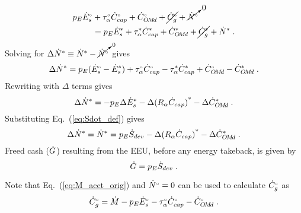 \begin{landscape}
{\begin{align}
  p_E {}{\dot{E}}^{\scriptscriptstyle \circ}_s &+ {}{\tau}^{\scriptscriptstyle \circ}_\alpha {}{\dot{C}}^{\scriptscriptstyle \circ}_{cap} + {}{\dot{C}}^{\scriptscriptstyle \circ}_{O\!M\!d} + \cancel{{}{\dot{C}}^{\scriptscriptstyle \circ}_g} + \cancelto{0}{{}{\dot{N}}^{\scriptscriptstyle \circ}} \nonumber \\
                   &= p_E {\dot{E}}^*_s + {\tau}^*_\alpha {\dot{C}}^*_{cap} + {\dot{C}}^*_{O\!M\!d} + \cancel{{\dot{C}}^*_g}  + {\dot{N}}^* \; .
\end{align}
%
Solving for $\Delta {\dot{N}}^* \equiv {\dot{N}}^* - \cancelto{0}{{}{\dot{N}}^{\scriptscriptstyle \circ}}$ gives 
%
\begin{equation}
  \Delta {\dot{N}}^* = p_E({}{\dot{E}}^{\scriptscriptstyle \circ}_s - {\dot{E}}^*_s) 
                      + {}{\tau}^{\scriptscriptstyle \circ}_\alpha {}{\dot{C}}^{\scriptscriptstyle \circ}_{cap} - {\tau}^*_\alpha {\dot{C}}^*_{cap}
                      + {}{\dot{C}}^{\scriptscriptstyle \circ}_{O\!M\!d} - {\dot{C}}^*_{O\!M\!d} \; .
\end{equation}
%
Rewriting with $\Delta$ terms gives
%
\begin{equation}
  \Delta {\dot{N}}^* = - p_E \Delta {\dot{E}}^*_s - \Delta {(R_\alpha \dot{C}_{cap})}^* - \Delta {\dot{C}}^*_{O\!M\!d} \; .
\end{equation}
%
Substituting Eq.~(\ref{eq:Sdot_def}) gives
%
\begin{equation} \label{eq:N_dot_star_empl}
  \Delta {\dot{N}}^* = {\dot{N}}^* = p_E \dot{S}_{dev} - \Delta {(R_\alpha \dot{C}_{cap})}^* - \Delta {\dot{C}}^*_{O\!M\!d} \; .
\end{equation}
%
Freed cash ($\dot{G}$) resulting from the EEU, 
before any energy takeback, is given by 
%
\begin{equation} \label{eq:G_dot}
  \dot{G} = p_E \dot{S}_{dev} \; .
\end{equation}

Note that Eq.~(\ref{eq:M_acct_orig}) and ${}{\dot{N}}^{\scriptscriptstyle \circ} = 0$ can be used to calculate ${}{\dot{C}}^{\scriptscriptstyle \circ}_g$ as
%
\begin{equation} \label{eq:C_dot_o}
  {}{\dot{C}}^{\scriptscriptstyle \circ}_g = \dot{M} - p_E {}{\dot{E}}^{\scriptscriptstyle \circ}_s - {}{\tau}^{\scriptscriptstyle \circ}_\alpha {}{\dot{C}}^{\scriptscriptstyle \circ}_{cap} - {}{\dot{C}}^{\scriptscriptstyle \circ}_{O\!M\!d} \; .
\end{equation}
%

}
\end{landscape}
